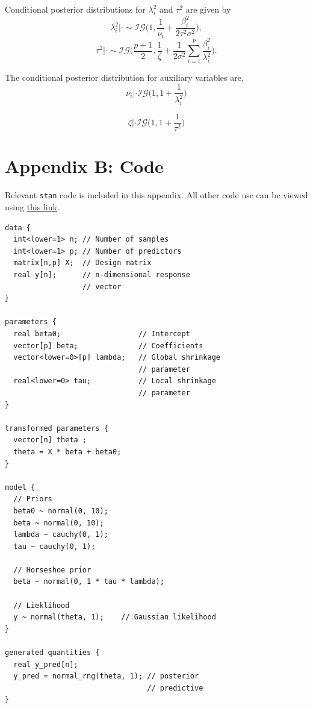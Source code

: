 \documentclass[
	a4paper, %
	10pt, %
	unnumberedsections, %
	twoside, %
]{LTJournalArticle}
\newcommand{\1}{\mathbbm{1}}
\begin{document}
Conditional posterior distributions for $\lambda_i^2$ and $\tau^2$ are given by
\begin{equation}
    \lambda_i^2 | \cdot \sim \mathcal{IG} \Big (1, \frac{1}{\nu_i} + \frac{\beta_i^2}{2\tau^2 \sigma^2} \Big ),
    \label{eq:A3}
\end{equation}
\begin{equation}
    \tau^2 | \cdot \sim \mathcal{IG} \Big (\frac{p+1}{2}, \frac{1}{\zeta} + \frac{1}{2\sigma^2}\sum_{i=1}^p \frac{\beta_i^2}{\lambda_i^2} \Big ).
    \label{eq:A4}
\end{equation}

The conditional posterior distribution for auxiliary variables are,
\begin{equation}
    \nu_i | \cdot \mathcal{IG} \Big (1, 1 + \frac{1}{\lambda_i^2} \Big )
    \label{eq:A5}
\end{equation}

\begin{equation}
    \zeta | \cdot  \mathcal{IG} \Big (1, 1 + \frac{1}{\tau^2} \Big )
    \label{eq:A6}
\end{equation}




\section{Appendix B: Code}

Relevant \verb|stan| code is included in this appendix. All other code use can be viewed using \href{https://github.com/sarahmasri/stat447C-Project}{this link}. 

\begin{verbatim}
data {
  int<lower=1> n; // Number of samples
  int<lower=1> p; // Number of predictors
  matrix[n,p] X;  // Design matrix
  real y[n];      // n-dimensional response 
                  // vector
}

parameters {
  real beta0;                  // Intercept
  vector[p] beta;              // Coefficients
  vector<lower=0>[p] lambda;   // Global shrinkage 
                               // parameter
  real<lower=0> tau;           // Local shrinkage 
                               // parameter
}

transformed parameters {
  vector[n] theta ;
  theta = X * beta + beta0;
}

model {
  // Priors
  beta0 ~ normal(0, 10);
  beta ~ normal(0, 10);
  lambda ~ cauchy(0, 1);
  tau ~ cauchy(0, 1);
  
  // Horseshoe prior
  beta ~ normal(0, 1 * tau * lambda); 
  
  // Lieklihood
  y ~ normal(theta, 1);    // Gaussian likelihood
}

generated quantities {
  real y_pred[n];
  y_pred = normal_rng(theta, 1); // posterior 
                                 // predictive
}
\end{verbatim}      
\end{document}
